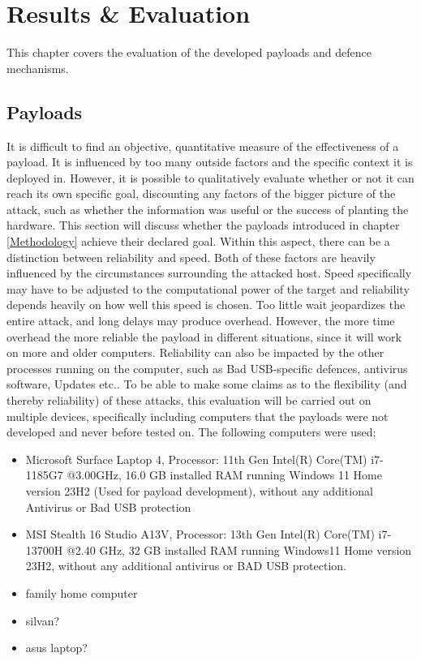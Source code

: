 \chapter{Results \& Evaluation} \label{Results}

This chapter covers the evaluation of the developed payloads and defence mechanisms. 


\section{Payloads}

It is difficult to find an objective, quantitative measure of the effectiveness of a payload. It is influenced by too many outside factors and the specific context it is deployed in. However, it is possible to qualitatively evaluate whether or not it can reach its own specific goal, discounting any factors of the bigger picture of the attack, such as whether the information was useful or the success of planting the hardware. This section will discuss whether the payloads introduced in chapter \ref{Methodology} achieve their declared goal. Within this aspect, there can be a distinction between reliability and speed. Both of these factors are heavily influenced by the circumstances surrounding the attacked host. Speed specifically may have to be adjusted to the computational power of the target and reliability depends heavily on how well this speed is chosen. Too little wait jeopardizes the entire attack, and long delays may produce overhead. However, the more time overhead the more reliable the payload in different situations, since it will work on more and older computers. Reliability can also be impacted by the other processes running on the computer, such as Bad USB-specific defences, antivirus software, Updates etc.. To be able to make some claims as to the flexibility (and thereby reliability) of these attacks, this evaluation will be carried out on multiple devices, specifically including computers that the payloads were not developed and never before tested on. The following computers were used;

\begin{itemize}
    \item Microsoft Surface Laptop 4, Processor: 11th Gen Intel(R) Core(TM) i7-1185G7 @3.00GHz, 16.0 GB installed RAM running Windows 11 Home version 23H2 (Used for payload development), without any additional Antivirus or Bad USB protection
    \item MSI Stealth 16 Studio A13V, Processor: 13th Gen Intel(R) Core(TM) i7-13700H @2.40 GHz, 32 GB installed RAM running Windows11 Home version 23H2, without any additional antivirus or BAD USB protection.
    \item family home computer
    \item silvan?
    \item asus laptop?
\end{itemize}
    
